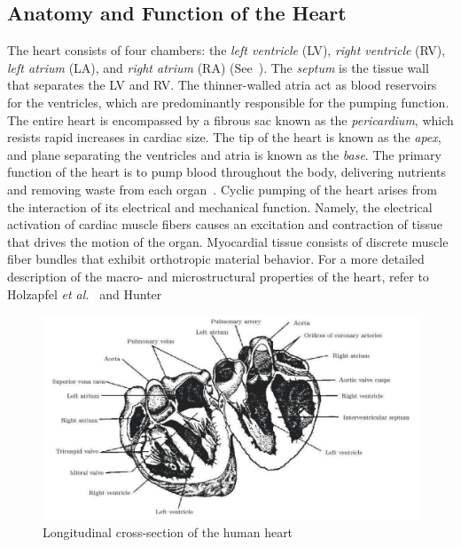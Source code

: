 \subsection{Anatomy and Function of the Heart}
The heart consists of four chambers: the \textit{left ventricle} (LV), \textit{right ventricle} (RV), \textit{left atrium} (LA), and \textit{right atrium} (RA) (See~). The \textit{septum} is the tissue wall that separates the LV and RV. The thinner-walled atria act as blood reservoirs for the ventricles, which are predominantly responsible for the pumping function. The entire heart is encompassed by a fibrous sac known as the \textit{pericardium}, which resists rapid increases in cardiac size. The tip of the heart is known as the \textit{apex}, and plane separating the ventricles and atria is known as the \textit{base}. The primary function of the heart is to pump blood throughout the body, delivering nutrients and removing waste from each organ~\cite{holzapfel_2009}. Cyclic pumping of the heart arises from the interaction of its electrical and mechanical function. Namely, the electrical activation of cardiac muscle fibers causes an excitation and contraction of tissue that drives the motion of the organ. Myocardial tissue consists of discrete muscle fiber bundles that exhibit orthotropic material behavior. For a more detailed description of the macro- and microstructural properties of the heart, refer to Holzapfel \textit{et al.}~\cite{holzapfel_2009} and Hunter~\cite{holzapfel_2009} 

\begin{figure}[htbp!]
\centering
\includegraphics[width=1.0\textwidth]{media/anatomy.png}
\caption{Longitudinal cross-section of the human heart~\cite{katz_2015}}
\label{fig:anatomy}
\end{figure}


